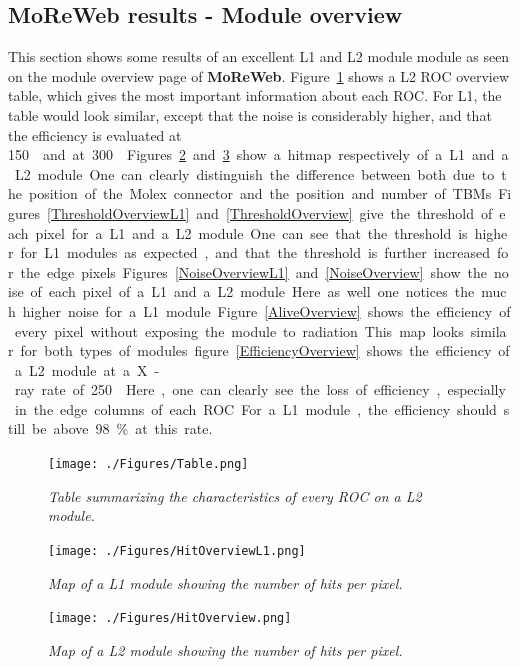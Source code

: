 \documentclass[a4paper,12pt,twoside]{article}
\begin{document}
\begin{appendices}
\section{MoReWeb results - Module overview} \label{ModuleOverview}

This section shows some results of an excellent L1 and L2 module module as seen on the module overview page of \textbf{MoReWeb}. Figure~\ref{Table} shows a L2 ROC overview table, which gives the most important information about each ROC. For L1, the table would look similar, except that the noise is considerably higher, and that the efficiency is evaluated at \SI{150}{\mega\hertz\per\centi\meter\square} and at \SI{300}{\mega\hertz\per\centi\meter\square}. Figures~\ref{HitOverviewL1} and \ref{HitOverview} show a hitmap respectively of a L1 and a L2 module. One can clearly distinguish the difference between both due to the position of the Molex connector and the position and number of TBMs. Figures~\ref{ThresholdOverviewL1} and \ref{ThresholdOverview} give the threshold of each pixel for a L1 and a L2 module. One can see that the threshold is higher for L1 modules as expected, and that the threshold is further increased for the edge pixels. Figures~\ref{NoiseOverviewL1} and \ref{NoiseOverview} show the noise of each pixel of a L1 and a L2 module. Here as well one notices the much higher noise for a L1 module. Figure~\ref{AliveOverview} shows the efficiency of every pixel without exposing the module to radiation. This map looks similar for both types of modules. figure~\ref{EfficiencyOverview} shows the efficiency of a L2 module at a X-ray rate of \SI{250}{\mega\hertz\per\centi\meter\square}. Here, one can clearly see the loss of efficiency, especially in the edge columns of each ROC. For a L1 module, the efficiency should still be above 98\% at this rate. 

\begin{figure} [h!] \centering 
\texttt{[image: ./Figures/Table.png]}
\caption{\em  \label{Table} 
Table summarizing the characteristics of every ROC on a L2 module.}
\end{figure}

\begin{figure} [h!] \centering 
\texttt{[image: ./Figures/HitOverviewL1.png]}
\caption{\em  \label{HitOverviewL1} 
Map of a L1 module showing the number of hits per pixel.}
\end{figure}

\begin{figure} [h!] \centering 
\texttt{[image: ./Figures/HitOverview.png]}
\caption{\em  \label{HitOverview} 
Map of a L2 module showing the number of hits per pixel.}
\end{figure}


\end{appendices}
\end{document}
